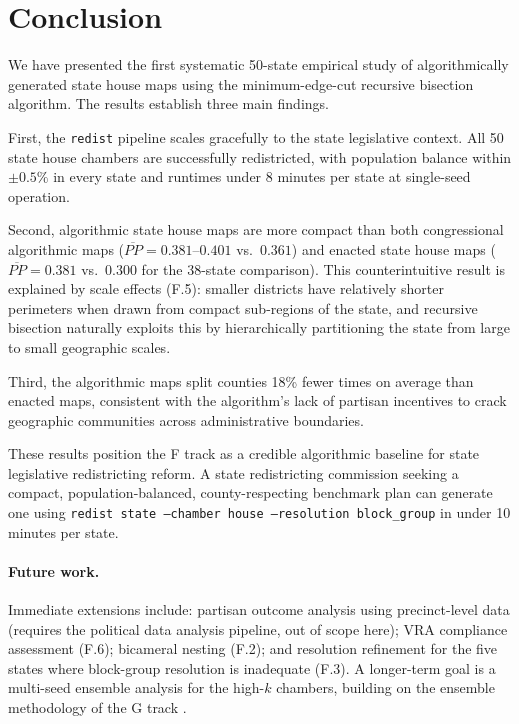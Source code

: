\section{Conclusion}
\label{sec:conclusion}

We have presented the first systematic 50-state empirical study of algorithmically
generated state house maps using the minimum-edge-cut recursive bisection
algorithm. The results establish three main findings.

First, the \texttt{redist} pipeline scales gracefully to the state legislative
context. All 50 state house chambers are successfully redistricted, with
population balance within $\pm 0.5\%$ in every state and runtimes under
8 minutes per state at single-seed operation.

Second, algorithmic state house maps are more compact than both congressional
algorithmic maps ($\overline{PP} = 0.381$--$0.401$ vs.\ $0.361$) and enacted
state house maps ($\overline{PP} = 0.381$ vs.\ $0.300$ for the 38-state
comparison). This counterintuitive result is explained by scale effects (F.5):
smaller districts have relatively shorter perimeters when drawn from compact
sub-regions of the state, and recursive bisection naturally exploits this by
hierarchically partitioning the state from large to small geographic scales.

Third, the algorithmic maps split counties 18\% fewer times on average than
enacted maps, consistent with the algorithm's lack of partisan incentives to
crack geographic communities across administrative boundaries.

These results position the F track as a credible algorithmic baseline for
state legislative redistricting reform. A state redistricting commission
seeking a compact, population-balanced, county-respecting benchmark plan
can generate one using \texttt{redist state --chamber house --resolution block\_group}
in under 10 minutes per state.

\paragraph{Future work.}
Immediate extensions include: partisan outcome analysis using precinct-level
data (requires the political data analysis pipeline, out of scope here);
VRA compliance assessment (F.6); bicameral nesting (F.2); and resolution
refinement for the five states where block-group resolution is inadequate (F.3).
A longer-term goal is a multi-seed ensemble analysis for the high-$k$ chambers,
building on the ensemble methodology of the G track
\citep{dellaLibera2026ensemble}.
